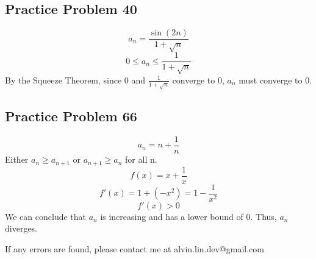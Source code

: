 \documentclass[letterpaper, 12pt]{article}
\begin{document}
\subsection*{Practice Problem 40}
\[ a_{n} = \frac{\sin(2n)}{1+\sqrt{n}} \]
\[ 0 \leq a_{n} \leq \frac{1}{1+\sqrt{n}} \]
By the Squeeze Theorem, since 0 and \( \frac{1}{1+\sqrt{n}} \) converge to 0,
\( a_{n} \) must converge to 0.

\subsection*{Practice Problem 66}
\[ a_{n} = n+\frac{1}{n} \]
Either \( a_{n} \geq a_{n+1} \) or \( a_{n+1} \geq a_{n} \) for all n.
\[ f(x) = x+\frac{1}{x} \]
\[ f'(x) = 1+(-x^{2}) = 1-\frac{1}{x^{2}} \]
\[ f'(x) > 0 \]
We can conclude that \( a_{n} \) is increasing and has a lower bound of 0.
Thus, \( a_{n} \) diverges.

\begin{center}
  If any errors are found, please contact me at alvin.lin.dev@gmail.com
\end{center}
\end{document}
